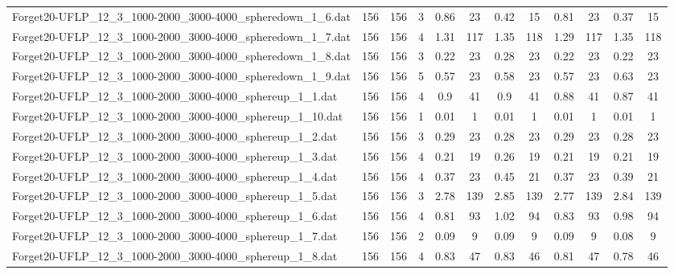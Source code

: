 \begin{sidewaystable}[!ht]
{\begin{tabular}{lccccccccccc}
Forget20-UFLP\_12\_3\_1000-2000\_3000-4000\_spheredown\_1\_6.dat & 156 & 156 & 3 & 0.86 & 23 & 0.42 & 15 & 0.81 & 23 &  \textcolor{blue2}{0.37} & 15 \\
Forget20-UFLP\_12\_3\_1000-2000\_3000-4000\_spheredown\_1\_7.dat & 156 & 156 & 4 & 1.31 & 117 & 1.35 & 118 &  \textcolor{blue2}{1.29} & 117 & 1.35 & 118 \\
Forget20-UFLP\_12\_3\_1000-2000\_3000-4000\_spheredown\_1\_8.dat & 156 & 156 & 3 &  \textcolor{blue2}{0.22} & 23 & 0.28 & 23 &  \textcolor{blue2}{0.22} & 23 &  \textcolor{blue2}{0.22} & 23 \\
Forget20-UFLP\_12\_3\_1000-2000\_3000-4000\_spheredown\_1\_9.dat & 156 & 156 & 5 &  \textcolor{blue2}{0.57} & 23 & 0.58 & 23 &  \textcolor{blue2}{0.57} & 23 & 0.63 & 23 \\
Forget20-UFLP\_12\_3\_1000-2000\_3000-4000\_sphereup\_1\_1.dat & 156 & 156 & 4 & 0.9 & 41 & 0.9 & 41 & 0.88 & 41 & 0.87 & 41 \\
Forget20-UFLP\_12\_3\_1000-2000\_3000-4000\_sphereup\_1\_10.dat & 156 & 156 & 1 &  \textcolor{blue2}{0.01} & 1 &  \textcolor{blue2}{0.01} & 1 &  \textcolor{blue2}{0.01} & 1 &  \textcolor{blue2}{0.01} & 1 \\
Forget20-UFLP\_12\_3\_1000-2000\_3000-4000\_sphereup\_1\_2.dat & 156 & 156 & 3 & 0.29 & 23 &  \textcolor{blue2}{0.28} & 23 & 0.29 & 23 &  \textcolor{blue2}{0.28} & 23 \\
Forget20-UFLP\_12\_3\_1000-2000\_3000-4000\_sphereup\_1\_3.dat & 156 & 156 & 4 &  \textcolor{blue2}{0.21} & 19 & 0.26 & 19 &  \textcolor{blue2}{0.21} & 19 &  \textcolor{blue2}{0.21} & 19 \\
Forget20-UFLP\_12\_3\_1000-2000\_3000-4000\_sphereup\_1\_4.dat & 156 & 156 & 4 &  \textcolor{blue2}{0.37} & 23 & 0.45 & 21 &  \textcolor{blue2}{0.37} & 23 & 0.39 & 21 \\
Forget20-UFLP\_12\_3\_1000-2000\_3000-4000\_sphereup\_1\_5.dat & 156 & 156 & 3 & 2.78 & 139 & 2.85 & 139 &  \textcolor{blue2}{2.77} & 139 & 2.84 & 139 \\
Forget20-UFLP\_12\_3\_1000-2000\_3000-4000\_sphereup\_1\_6.dat & 156 & 156 & 4 &  \textcolor{blue2}{0.81} & 93 & 1.02 & 94 & 0.83 & 93 & 0.98 & 94 \\
Forget20-UFLP\_12\_3\_1000-2000\_3000-4000\_sphereup\_1\_7.dat & 156 & 156 & 2 & 0.09 & 9 & 0.09 & 9 & 0.09 & 9 &  \textcolor{blue2}{0.08} & 9 \\
Forget20-UFLP\_12\_3\_1000-2000\_3000-4000\_sphereup\_1\_8.dat & 156 & 156 & 4 & 0.83 & 47 & 0.83 & 46 & 0.81 & 47 &  \textcolor{blue2}{0.78} & 46 \\

\end{tabular}}
\end{sidewaystable}
